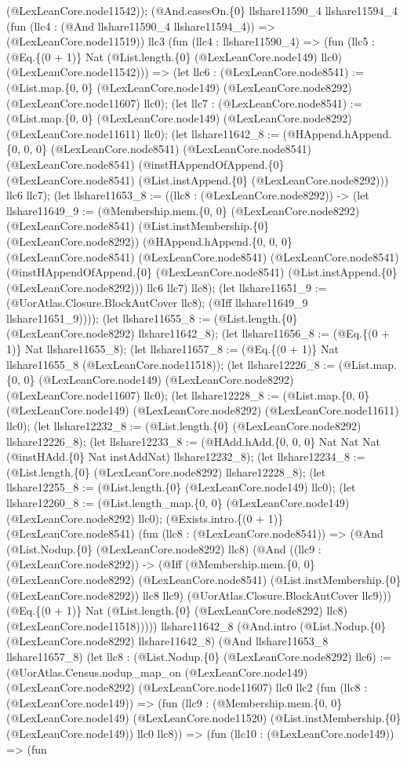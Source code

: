 \documentclass[11pt]{article}
\begin{document}
(@LexLeanCore.node11542)); (@And.casesOn.\{0\} llshare11590\_4 llshare11594\_4 (fun (llc4 : (@And llshare11590\_4 llshare11594\_4)) => (@LexLeanCore.node11519)) llc3 (fun (llc4 : llshare11590\_4) => (fun (llc5 : (@Eq.\{(0 + 1)\} Nat (@List.length.\{0\} (@LexLeanCore.node149) llc0) (@LexLeanCore.node11542))) => (let llc6 : (@LexLeanCore.node8541) := (@List.map.\{0, 0\} (@LexLeanCore.node149) (@LexLeanCore.node8292) (@LexLeanCore.node11607) llc0); (let llc7 : (@LexLeanCore.node8541) := (@List.map.\{0, 0\} (@LexLeanCore.node149) (@LexLeanCore.node8292) (@LexLeanCore.node11611) llc0); (let llshare11642\_8 := (@HAppend.hAppend.\{0, 0, 0\} (@LexLeanCore.node8541) (@LexLeanCore.node8541) (@LexLeanCore.node8541) (@instHAppendOfAppend.\{0\} (@LexLeanCore.node8541) (@List.instAppend.\{0\} (@LexLeanCore.node8292))) llc6 llc7); (let llshare11653\_8 := ((llc8 : (@LexLeanCore.node8292)) -> (let llshare11649\_9 := (@Membership.mem.\{0, 0\} (@LexLeanCore.node8292) (@LexLeanCore.node8541) (@List.instMembership.\{0\} (@LexLeanCore.node8292)) (@HAppend.hAppend.\{0, 0, 0\} (@LexLeanCore.node8541) (@LexLeanCore.node8541) (@LexLeanCore.node8541) (@instHAppendOfAppend.\{0\} (@LexLeanCore.node8541) (@List.instAppend.\{0\} (@LexLeanCore.node8292))) llc6 llc7) llc8); (let llshare11651\_9 := (@UorAtlas.Closure.BlockAutCover llc8); (@Iff llshare11649\_9 llshare11651\_9)))); (let llshare11655\_8 := (@List.length.\{0\} (@LexLeanCore.node8292) llshare11642\_8); (let llshare11656\_8 := (@Eq.\{(0 + 1)\} Nat llshare11655\_8); (let llshare11657\_8 := (@Eq.\{(0 + 1)\} Nat llshare11655\_8 (@LexLeanCore.node11518)); (let llshare12226\_8 := (@List.map.\{0, 0\} (@LexLeanCore.node149) (@LexLeanCore.node8292) (@LexLeanCore.node11607) llc0); (let llshare12228\_8 := (@List.map.\{0, 0\} (@LexLeanCore.node149) (@LexLeanCore.node8292) (@LexLeanCore.node11611) llc0); (let llshare12232\_8 := (@List.length.\{0\} (@LexLeanCore.node8292) llshare12226\_8); (let llshare12233\_8 := (@HAdd.hAdd.\{0, 0, 0\} Nat Nat Nat (@instHAdd.\{0\} Nat instAddNat) llshare12232\_8); (let llshare12234\_8 := (@List.length.\{0\} (@LexLeanCore.node8292) llshare12228\_8); (let llshare12255\_8 := (@List.length.\{0\} (@LexLeanCore.node149) llc0); (let llshare12260\_8 := (@List.length\_map.\{0, 0\} (@LexLeanCore.node149) (@LexLeanCore.node8292) llc0); (@Exists.intro.\{(0 + 1)\} (@LexLeanCore.node8541) (fun (llc8 : (@LexLeanCore.node8541)) => (@And (@List.Nodup.\{0\} (@LexLeanCore.node8292) llc8) (@And ((llc9 : (@LexLeanCore.node8292)) -> (@Iff (@Membership.mem.\{0, 0\} (@LexLeanCore.node8292) (@LexLeanCore.node8541) (@List.instMembership.\{0\} (@LexLeanCore.node8292)) llc8 llc9) (@UorAtlas.Closure.BlockAutCover llc9))) (@Eq.\{(0 + 1)\} Nat (@List.length.\{0\} (@LexLeanCore.node8292) llc8) (@LexLeanCore.node11518))))) llshare11642\_8 (@And.intro (@List.Nodup.\{0\} (@LexLeanCore.node8292) llshare11642\_8) (@And llshare11653\_8 llshare11657\_8) (let llc8 : (@List.Nodup.\{0\} (@LexLeanCore.node8292) llc6) := (@UorAtlas.Census.nodup\_map\_on (@LexLeanCore.node149) (@LexLeanCore.node8292) (@LexLeanCore.node11607) llc0 llc2 (fun (llc8 : (@LexLeanCore.node149)) => (fun (llc9 : (@Membership.mem.\{0, 0\} (@LexLeanCore.node149) (@LexLeanCore.node11520) (@List.instMembership.\{0\} (@LexLeanCore.node149)) llc0 llc8)) => (fun (llc10 : (@LexLeanCore.node149)) => (fun 
\end{document}
